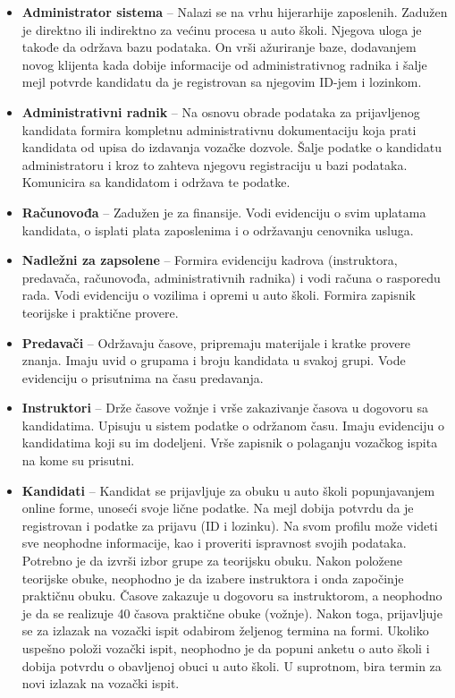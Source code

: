 \begin{itemize}
\item \textbf{Administrator sistema} – Nalazi se na vrhu hijerarhije zaposlenih. Zadužen je direktno ili indirektno za većinu procesa u auto školi. Njegova uloga je takođe da održava bazu podataka. On vrši ažuriranje baze, dodavanjem novog klijenta kada dobije informacije od administrativnog radnika i šalje mejl potvrde kandidatu da je registrovan sa njegovim ID-jem i lozinkom.
\item \textbf{Administrativni radnik} – Na osnovu obrade podataka za prijavljenog kandidata formira kompletnu administrativnu dokumentaciju koja prati kandidata od upisa do izdavanja vozačke dozvole. Šalje podatke o kandidatu administratoru i kroz to zahteva njegovu registraciju u bazi podataka. Komunicira sa kandidatom i održava te podatke. 
\item \textbf{Računovođa} – Zadužen je za finansije. Vodi evidenciju o svim uplatama kandidata, o isplati plata zaposlenima i o održavanju cenovnika usluga.
\item \textbf{Nadležni za zapsolene} – Formira evidenciju kadrova (instruktora, predavača, ra\-čunovođa, administrativnih radnika) i vodi računa o rasporedu rada. Vodi evidenciju o vozilima i opremi u auto školi. Formira zapisnik teorijske i praktične provere.
\item \textbf{Predavači} – Održavaju časove, pripremaju materijale i kratke provere znanja. Imaju uvid o grupama i broju kandidata u svakoj grupi. Vode evidenciju o prisutnima na času predavanja.
\item \textbf{Instruktori} – Drže časove vožnje i vrše zakazivanje časova u dogovoru sa kandidatima. Upisuju u sistem podatke o održanom času. Imaju evidenciju o kandidatima koji su im dodeljeni. Vrše zapisnik o polaganju vozačkog ispita na kome su prisutni.
\item \textbf{Kandidati} – Kandidat se prijavljuje za obuku u auto školi  popunjavanjem online forme, unoseći svoje lične podatke. Na mejl dobija potvrdu da je registrovan i podatke za prijavu (ID i lozinku). Na svom profilu može videti sve neophodne informacije, kao i proveriti ispravnost svojih podataka. Potrebno je da izvrši izbor grupe za teorijsku obuku. Nakon položene teorijske obuke, neophodno je da izabere instruktora i onda započinje praktičnu obuku. 
Časove zakazuje u dogovoru sa instruktorom, a neophodno je da se realizuje 40 časova praktične obuke (vožnje). 
Nakon toga, prijavljuje se za izlazak na vozački ispit odabirom željenog termina na formi. Ukoliko uspešno položi vozački ispit, neophodno je da popuni anketu o auto školi i dobija potvrdu o obavljenoj obuci u auto školi. U suprotnom, bira termin za novi izlazak na vozački ispit. 

\end{itemize}

